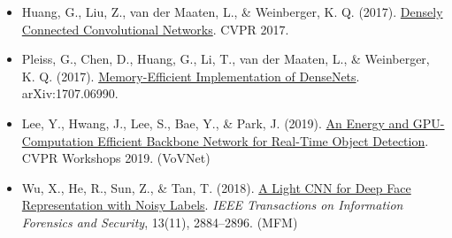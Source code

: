 \vspace{0.25em}
\begin{itemize}
\tightlist
\item
  Huang, G., Liu, Z., van der Maaten, L., \& Weinberger, K. Q. (2017). \href{https://arxiv.org/abs/1608.06993}{Densely Connected Convolutional Networks}. CVPR 2017.
\item
  Pleiss, G., Chen, D., Huang, G., Li, T., van der Maaten, L., \& Weinberger, K. Q. (2017). \href{https://arxiv.org/abs/1707.06990}{Memory-Efficient Implementation of DenseNets}. arXiv:1707.06990.
\item
  Lee, Y., Hwang, J., Lee, S., Bae, Y., \& Park, J. (2019). \href{https://openaccess.thecvf.com/content_CVPRW_2019/html/CEFRL/Lee_An_Energy_and_GPU-Computation_Efficient_Backbone_Network_for_Real-Time_Object_CVPRW_2019_paper.html}{An Energy and GPU-Computation Efficient Backbone Network for Real-Time Object Detection}. CVPR Workshops 2019. (VoVNet)
\item
  Wu, X., He, R., Sun, Z., \& Tan, T. (2018). \href{https://arxiv.org/abs/1511.02683}{A Light CNN for Deep Face Representation with Noisy Labels}. \emph{IEEE Transactions on Information Forensics and Security}, 13(11), 2884--2896. (MFM)
\end{itemize}

\clearpage
